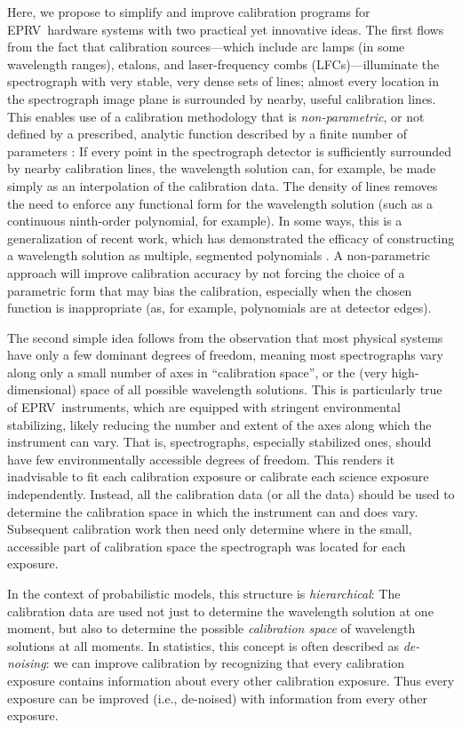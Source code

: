 \documentclass[modern]{aastex63}
\newcommand{\acronym}[1]{{\small{#1}}}
\newcommand{\eprv}{\acronym{EPRV}}
\newcommand{\lfc}{\acronym{LFC}}
\begin{document}
Here, we propose to simplify and improve calibration programs for \eprv\ hardware systems with two practical yet innovative ideas.  The first flows from the fact that calibration sources---which include arc lamps (in some wavelength ranges), etalons, and laser-frequency combs (\lfc s)---illuminate the spectrograph with very stable, very dense sets of lines; almost every location in the spectrograph image plane is surrounded by nearby, useful calibration lines.  This enables use of a calibration methodology that is \emph{non-parametric}, or not defined by a prescribed, analytic function described by a finite number of parameters :  If every point in the spectrograph detector is sufficiently surrounded by nearby calibration lines, the wavelength solution can, for example, be made simply as an interpolation of the calibration data.  The density of lines removes the need to enforce any functional form for the wavelength solution (such as a continuous ninth-order polynomial, for example).  In some ways, this is a generalization of recent work, which has demonstrated the efficacy of constructing a wavelength solution as multiple, segmented polynomials \citep{milakovic2020}.  A non-parametric approach will improve calibration accuracy by not forcing the choice of a parametric form that may bias the calibration, especially when the chosen function is inappropriate (as, for example, polynomials are at detector edges).

The second simple idea follows from the observation that most physical systems have only a few dominant degrees of freedom, meaning most spectrographs vary along only a small number of axes in ``calibration space'', or the (very high-dimensional) space of all possible wavelength solutions.  This is particularly true of \eprv\ instruments, which are equipped with stringent environmental stabilizing, likely reducing the number and extent of the axes along which the instrument can vary.  That is, spectrographs, especially stabilized ones, should have few environmentally accessible degrees of freedom.  This renders it inadvisable to fit each calibration exposure or calibrate each science exposure independently.  Instead, all the calibration data (or all the data) should be used to determine the calibration space in which the instrument can and does vary.  Subsequent calibration work then need only determine where in the small, accessible part of calibration space the spectrograph was located for each exposure.

In the context of probabilistic models, this structure is \emph{hierarchical}:  The calibration data are used not just to determine the wavelength solution at one moment, but also to determine the possible \emph{calibration space} of wavelength solutions at all moments.  In statistics, this concept is often described as \emph{de-noising}:  we can improve calibration by recognizing that every calibration exposure contains information about every other calibration exposure.  Thus every exposure can be improved (i.e., de-noised) with information from every other exposure.
\end{document}
